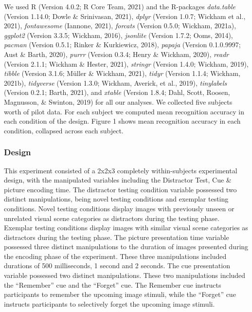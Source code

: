 \documentclass[
  english,
  man,floatsintext]{apa6}
\begin{document}
We used R (Version 4.0.2; R Core Team, 2021) and the R-packages \emph{data.table} (Version 1.14.0; Dowle \& Srinivasan, 2021), \emph{dplyr} (Version 1.0.7; Wickham et al., 2021), \emph{fontawesome} (Iannone, 2021), \emph{forcats} (Version 0.5.0; Wickham, 2021a), \emph{ggplot2} (Version 3.3.5; Wickham, 2016), \emph{jsonlite} (Version 1.7.2; Ooms, 2014), \emph{pacman} (Version 0.5.1; Rinker \& Kurkiewicz, 2018), \emph{papaja} (Version 0.1.0.9997; Aust \& Barth, 2020), \emph{purrr} (Version 0.3.4; Henry \& Wickham, 2020), \emph{readr} (Version 2.1.1; Wickham \& Hester, 2021), \emph{stringr} (Version 1.4.0; Wickham, 2019), \emph{tibble} (Version 3.1.6; Müller \& Wickham, 2021), \emph{tidyr} (Version 1.1.4; Wickham, 2021b), \emph{tidyverse} (Version 1.3.0; Wickham, Averick, et al., 2019), \emph{tinylabels} (Version 0.2.1; Barth, 2021), and \emph{xtable} (Version 1.8.4; Dahl, Scott, Roosen, Magnusson, \& Swinton, 2019) for all our analyses. We collected five subjects worth of pilot data. For each subject we computed mean recognition accuracy in each condition of the design. Figure 1 shows mean recognition accuracy in each condition, collapsed across each subject.

\hypertarget{design}{%
\subsubsection{Design}\label{design}}

This experiment consisted of a 2x2x3 completely within-subjects experimental design, with the manipulated variables including the Distractor Test, Cue \& picture encoding time. The distractor testing condition variable possessed two distinct manipulations, being novel testing conditions and exemplar testing conditions. Novel testing conditions display images with previously unseen or unrelated visual scene categories as distractors during the testing phase. Exemplar testing conditions display images with similar visual scene categories as distractors during the testing phase. The picture presentation time variable possessed three distinct manipulations to the duration of images presented during the encoding phase of the experiment. These three manipulations included durations of 500 milliseconds, 1 second and 2 seconds. The cue presentation variable possessed two distinct manipulations. These two manipulations included the \enquote{Remember} cue and the \enquote{Forget} cue. The Remember cue instructs participants to remember the upcoming image stimuli, while the \enquote{Forget} cue instructs participants to selectively forget the upcoming image stimuli.
\end{document}
